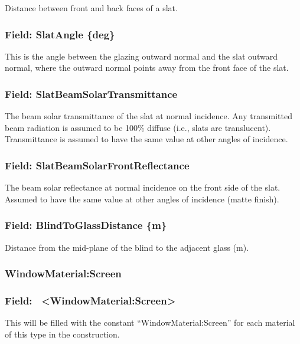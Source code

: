 Distance between front and back faces of a slat.

\subsubsection{Field: SlatAngle \{deg\}}\label{field-slatangle-deg}

This is the angle between the glazing outward normal and the slat outward normal, where the outward normal points away from the front face of the slat.

\subsubsection{Field: SlatBeamSolarTransmittance}\label{field-slatbeamsolartransmittance}

The beam solar transmittance of the slat at normal incidence. Any transmitted beam radiation is assumed to be 100\% diffuse (i.e., slats are translucent). Transmittance is assumed to have the same value at other angles of incidence.

\subsubsection{Field: SlatBeamSolarFrontReflectance}\label{field-slatbeamsolarfrontreflectance}

The beam solar reflectance at normal incidence on the front side of the slat. Assumed to have the same value at other angles of incidence (matte finish).

\subsubsection{Field: BlindToGlassDistance \{m\}}\label{field-blindtoglassdistance-m}

Distance from the mid-plane of the blind to the adjacent glass (m).

\subsubsection{WindowMaterial:Screen}\label{materialwindowscreen}

\subsubsection{Field:~ \textless{}WindowMaterial:Screen\textgreater{}}\label{field-materialwindowscreen}

This will be filled with the constant ``WindowMaterial:Screen'' for each material of this type in the construction.

